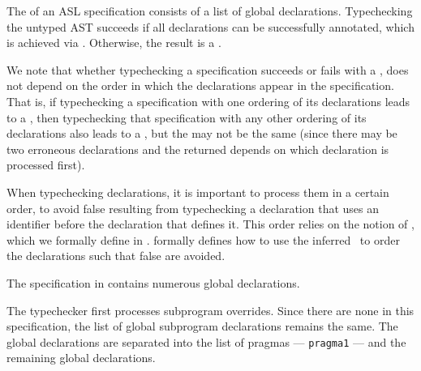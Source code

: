 The \untypedast{} of an ASL specification consists of a list of global declarations.
Typechecking the untyped AST succeeds if all declarations can be successfully annotated,
which is achieved via . Otherwise, the result is a
\typingerrorterm{}.

We note that whether typechecking a specification succeeds or fails with a \typingerrorsterm,
does not depend on the order in which the declarations appear in the specification.
That is, if typechecking a specification with one ordering of its declarations leads to
a \typingerrorterm{}, then typechecking that specification with any other ordering of its
declarations also leads to a \typingerrorterm{}, but the \typingerrorsterm{} may not be the same
(since there may be two erroneous declarations and the \typingerrorterm{} returned
depends on which declaration is processed first).

When typechecking declarations, it is important to process them in a certain order,
to avoid false \typingerrorsterm{} resulting from typechecking a declaration that uses an identifier
before the declaration that defines it.
This order relies on the notion of , which we formally define in
.
 formally defines how to use the inferred \ to
order the declarations such that false \typingerrorsterm{} are avoided.



The specification in  contains numerous global declarations.


The typechecker first processes subprogram overrides. Since there are none in this specification,
the list of global subprogram declarations remains the same.
The global declarations are separated into the list of pragmas --- \verb|pragma1| --- and the remaining
global declarations.

